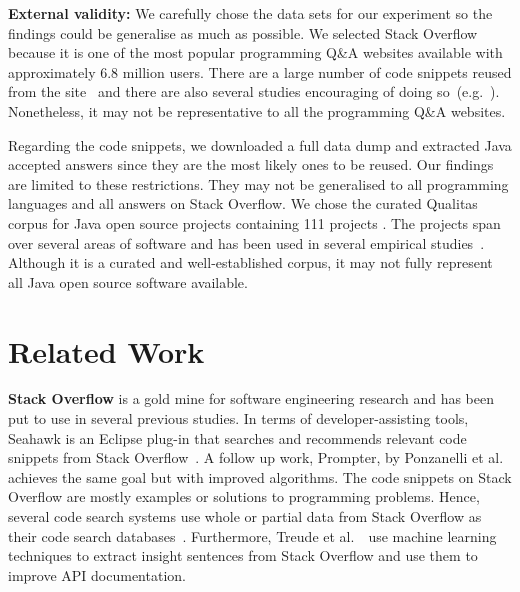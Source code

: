 \documentclass[sigconf,review, anonymous]{acmart}
\begin{document}
\textbf{External validity:} We carefully chose the data sets for our
experiment so the findings could be generalise as much as possible.
We selected Stack Overflow because it is one of the most popular
programming Q\&A websites available with approximately 6.8 million
users.  There are a large number of code snippets reused from the
site~\cite{An2017} and there are also several studies encouraging of
doing
so~(e.g.~\cite{Ponzanelli2013,Ponzanelli2014,Keivanloo2014,Park2014}).
Nonetheless, it may not be representative to all the programming Q\&A
websites.

Regarding the code snippets, we downloaded a full data dump and
extracted Java accepted answers
since they are the
most likely ones to be reused. 
Our findings are limited to these restrictions. They may
not be generalised to all programming languages and all answers on
Stack Overflow. We chose the curated Qualitas
corpus for Java open source projects containing 111 projects
\cite{QualitasCorpus}.  The projects span over several areas of
software and has been used in several empirical
studies~\cite{Taube-Schock2011,Beckman2011,Vasilescu2011,Omar2012}. Although
it is a curated and well-established corpus, it may not fully
represent all Java open source software available.


\section{Related Work}

\textbf{Stack Overflow} is a gold mine for software engineering
research and
has been put to
use in several previous studies. In terms of developer-assisting
tools, Seahawk is an Eclipse plug-in that searches and recommends
relevant code snippets from Stack Overflow~\cite{Ponzanelli2013}. A
follow up work, Prompter, by Ponzanelli et al.~\cite{Ponzanelli2014}
achieves the same goal but with improved algorithms. The code snippets
on Stack Overflow are mostly examples or solutions to programming
problems. Hence, several code search systems use whole or partial data
from Stack Overflow as their code search
databases~\cite{Keivanloo2014,Park2014,
  Stolee2014,Subramanian2013,Diamantopoulos2015}. Furthermore, Treude
et al.~\cite{Treude2016}~use machine learning techniques to extract
insight sentences from Stack Overflow and use them to improve API
documentation.
\end{document}
